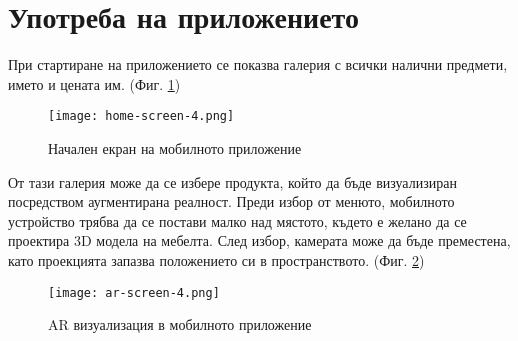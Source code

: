 \section{Употреба на приложението}
При стартиране на приложението се показва галерия с всички налични предмети, името и цената им. (Фиг. \ref{fig:home-screen-in-4})
\begin{figure}[H]
    \texttt{[image: home-screen-4.png]}
    \centering
    \caption{Начален екран на мобилното приложение}
    \label{fig:home-screen-in-4}
\end{figure}

От тази галерия може да се избере продукта, който да бъде визуализиран посредством аугментирана реалност. Преди избор от менюто, мобилното устройство трябва да се постави малко над мястото, където е желано да се проектира 3D модела на мебелта. След избор, камерата може да бъде преместена, като проекцията запазва положението си в пространството. (Фиг. \ref{fig:ar-screen-in-4})
\begin{figure}[H]
    \texttt{[image: ar-screen-4.png]}
    \centering
    \caption{AR визуализация в мобилното приложение}
    \label{fig:ar-screen-in-4}
\end{figure}